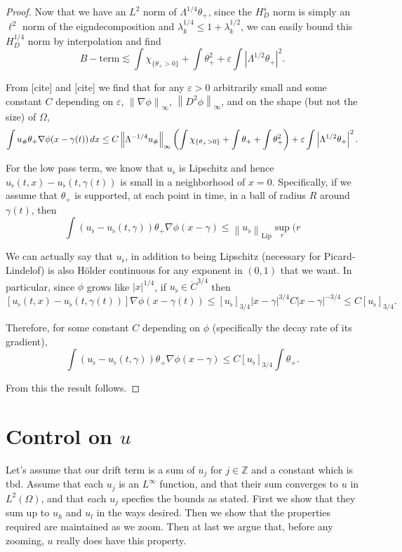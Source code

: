 \documentclass[11pt]{amsart}
\theoremstyle{remark}
\newcommand{\Z}{\mathbb{Z}}
\newcommand{\eps}{\varepsilon}
\newcommand{\norm}[1]{\left\lVert#1\right\rVert}
\newcommand{\paren}[1]{\left( #1 \right)}
\newcommand{\bracket}[1]{\left[ #1 \right]}
\newcommand{\abs}[1]{\left\lvert #1 \right\rvert}
\newcommand{\grad}{\nabla}
\newcommand{\Lip}{\text{Lip}}
\newcommand{\indic}[1]{\chi_{\{#1\}}}
\newcommand{\ulow}{u_\flat}
\newcommand{\uhigh}{u_{\scalebox{0.7}{\#}}}
\begin{document}
\begin{proof}
Now that we have an $L^2$ norm of $\Lambda^{1/4} \theta_+$, since the $H^s_D$ norm is simply an $\ell^2$ norm of the eigndecomposition and $\lambda_k^{1/4} \leq 1 + \lambda_k^{1/2}$, we can easily bound this $H^{1/4}_D$ norm by interpolation and find
\[ B-\textrm{term} \lesssim \int \indic{\theta_+>0} + \int \theta_+^2 + \eps \int \abs{\Lambda^{1/2} \theta_+}^2. \]

From [cite] and [cite] we find that for any $\eps > 0$ arbitrarily small and some constant $C$ depending on $\eps$, $\norm{\grad\phi}_\infty$, $\norm{D^2 \phi}_\infty$, and on the shape (but not the size) of $\Omega$,
\[ \int \uhigh \theta_+ \grad \phi(x - \gamma(t)) \,dx \leq C \norm{\Lambda^{-1/4}\uhigh}_\infty \paren{\int \indic{\theta_+>0} + \int \theta_+ + \int \theta_+^2} + \eps \int \abs{\Lambda^{1/2} \theta_+}^2. \]

For the low pass term, we know that $\ulow$ is Lipschitz and hence $\ulow(t,x) - \ulow(t,\gamma(t))$ is small in a neighborhood of $x=0$.  Specifically, if we assume that $\theta_+$ is supported, at each point in time, in a ball of radius $R$ around $\gamma(t)$, then
\[ \int (\ulow - \ulow(t,\gamma)) \theta_+\grad\phi(x-\gamma) \leq \norm{\ulow}_\Lip \sup_r (r \]

We can actually say that $\ulow$, in addition to being Lipschitz (necessary for Picard-Lindelof) is also H\"{o}lder continuous for any exponent in $(0,1)$ that we want.  In particular, since $\phi$ grows like $|x|^{1/4}$, if $\ulow \in \dot{C}^{3/4}$ then
\[ [\ulow(t,x) - \ulow(t,\gamma(t))] \grad \phi(x-\gamma(t)) \leq \bracket{\ulow}_{3/4} |x-\gamma|^{3/4} C |x-\gamma|^{-3/4} \leq C \bracket{\ulow}_{3/4}. \]

Therefore, for some constant $C$ depending on $\phi$ (specifically the decay rate of its gradient),
\[ \int (\ulow - \ulow(t,\gamma)) \theta_+\grad\phi(x-\gamma) \leq C \bracket{\ulow}_{3/4} \int \theta_+. \]

From this the result follows.  
\end{proof}




\section{Control on $u$}
Let's assume that our drift term is a sum of $u_j$ for $j \in \Z$ and a constant which is tbd.  Assume that each $u_j$ is an $L^\infty$ function, and that their sum converges to $u$ in $L^2(\Omega)$, and that each $u_j$ specfies the bounds as stated.  First we show that they sum up to $u_h$ and $u_l$ in the ways desired.  Then we show that the properties required are maintained as we zoom.  Then at last we argue that, before any zooming, $u$ really does have this property.  
\end{document}
